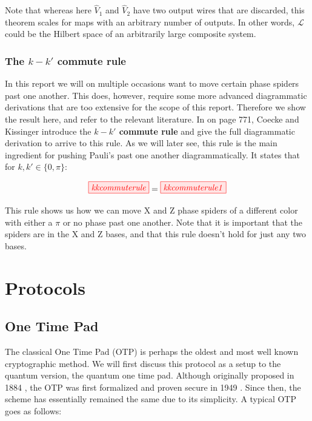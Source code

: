 \documentclass[]{article}
\begin{document}
Note that whereas here $\hat{V}_1$ and $\hat{V}_2$ have two output wires that are discarded, this theorem scales for maps with an arbitrary number of outputs. In other words, $\mathcal{L}$ could be the Hilbert space of an arbitrarily large composite system.

\subsubsection{The $k-k'$ commute rule}
\label{section:kkcommute}
In this report we will on multiple occasions want to move certain phase spiders past one another. This does, however, require some more advanced diagrammatic derivations that are too extensive for the scope of this report. Therefore we show the result here, and refer to the relevant literature. In \cite{Coecke2017} on page 771, Coecke and Kissinger introduce the \textbf{$k-k'$ commute rule} and give the full diagrammatic derivation to arrive to this rule. As we will later see, this rule is the main ingredient for pushing Pauli's past one another diagrammatically. It states that for $k, k' \in \{0, \pi\}$: 

\begin{equation}
\label{equation:kkcommuterule}
\tikzfig{kkcommuterule} = \tikzfig{kkcommuterule1}
\end{equation}

This rule shows us how we can move X and Z phase spiders of a different color with either a $\pi$ or no phase past one another. Note that it is important that the spiders are in the X and Z bases, and that this rule doesn't hold for just any two bases.

\section{Protocols}
\label{section:protocols}

\subsection{One Time Pad}

The classical One Time Pad (OTP) is perhaps the oldest and most well known cryptographic method. We will first discuss this protocol as a setup to the quantum version, the quantum one time pad. Although originally proposed in 1884 \cite{Markoff2011}, the OTP was first formalized and proven secure in 1949 \cite{Shannon1949}. Since then, the scheme has essentially remained the same due to its simplicity. A typical OTP goes as follows:
\end{document}

